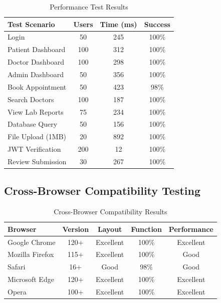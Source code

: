 \begin{table}[H]
    \centering
    \small
    \setlength{\tabcolsep}{3pt}
    \begin{tabular}{|l|c|c|c|}
        \hline
        \textbf{Test Scenario} & \textbf{Users} & \textbf{Time (ms)} & \textbf{Success} \\
        \hline
        Login & 50 & 245 & 100\% \\
        \hline
        Patient Dashboard & 100 & 312 & 100\% \\
        \hline
        Doctor Dashboard & 100 & 298 & 100\% \\
        \hline
        Admin Dashboard & 50 & 356 & 100\% \\
        \hline
        Book Appointment & 50 & 423 & 98\% \\
        \hline
        Search Doctors & 100 & 187 & 100\% \\
        \hline
        View Lab Reports & 75 & 234 & 100\% \\
        \hline
        Database Query & 50 & 156 & 100\% \\
        \hline
        File Upload (1MB) & 20 & 892 & 100\% \\
        \hline
        JWT Verification & 200 & 12 & 100\% \\
        \hline
        Review Submission & 30 & 267 & 100\% \\
        \hline
    \end{tabular}
    \caption{Performance Test Results}
    \label{tab:performance}
\end{table}

\subsection{Cross-Browser Compatibility Testing}

\begin{table}[H]
    \centering
    \small
    \setlength{\tabcolsep}{3pt}
    \begin{tabular}{|l|c|c|c|c|}
        \hline
        \textbf{Browser} & \textbf{Version} & \textbf{Layout} & \textbf{Function} & \textbf{Performance} \\
        \hline
        Google Chrome & 120+ & Excellent & 100\% & Excellent \\
        \hline
        Mozilla Firefox & 115+ & Excellent & 100\% & Good \\
        \hline
        Safari & 16+ & Good & 98\% & Good \\
        \hline
        Microsoft Edge & 120+ & Excellent & 100\% & Excellent \\
        \hline
        Opera & 100+ & Excellent & 100\% & Excellent \\
        \hline
    \end{tabular}
    \caption{Cross-Browser Compatibility Results}
    \label{tab:browsers}
\end{table}

